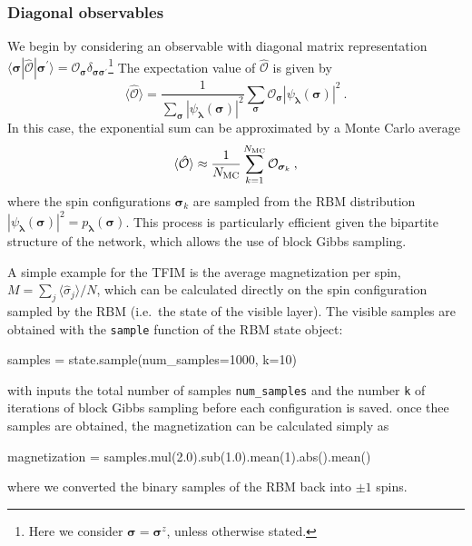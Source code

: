 \documentclass[submission, Phys]{SciPost}
\begin{document}
\subsubsection{Diagonal observables}
We begin by considering an observable with diagonal matrix representation $\langle\bm{\sigma}|\hat{\mathcal{O}}|\bm{\sigma}^{\prime}\rangle=\mathcal{O}_{\bm{\sigma}}\delta_{\bm{\sigma\sigma}^\prime}$\footnote{Here we consider $\bm{\sigma}=\bm{\sigma}^z$, unless otherwise stated.} The expectation value of $\hat{\mathcal{O}}$ is given by
\begin{equation}
\langle \hat{\mathcal{O}} \rangle = \frac{1}{\sum_{\bm{\sigma}} |\psi_{\bm{\lambda}}(\bm{\sigma})|^2}
\sum_{\bm{\sigma}}  \mathcal{O}_{\bm{\sigma}}|\psi_{\bm{\lambda}}(\bm{\sigma})|^2\:.
\end{equation}
In this case, the exponential sum can be approximated by a Monte Carlo average
\begin{equation}
\langle \hat{\mathcal{O}}\rangle \approx \frac{1}{N_{\rm MC}} \sum_{k=1}^{N_{\rm MC}}  \mathcal{O}_{\bm{\sigma}_k}\:,
\end{equation}
where the spin configurations $\bm{\sigma}_k$ are sampled from the RBM distribution $|\psi_{\bm{\lambda}}(\bm{\sigma})|^2=p_{\bm{\lambda}}(\bm{\sigma})$. This process is particularly efficient given the bipartite structure of the network, which allows the use of  block Gibbs sampling. 


A simple example for the TFIM is the average magnetization per spin, $M=\sum_j\langle\hat{\sigma}_j\rangle/N$, which can be calculated directly on the spin configuration sampled by the RBM (i.e.~the state of the visible layer). The visible samples are obtained with the \verb|sample| function of the RBM state object:
\begin{python}
samples = state.sample(num_samples=1000, k=10)
\end{python}
with inputs the total number of samples \verb|num_samples| and the number \verb|k| of iterations of block Gibbs sampling before each configuration is saved. once thee samples are obtained, the magnetization can be calculated simply as
\begin{python}
magnetization = samples.mul(2.0).sub(1.0).mean(1).abs().mean()
\end{python}
where we converted the binary samples of the RBM back into $\pm 1$ spins.

%
%
%
\end{document}

